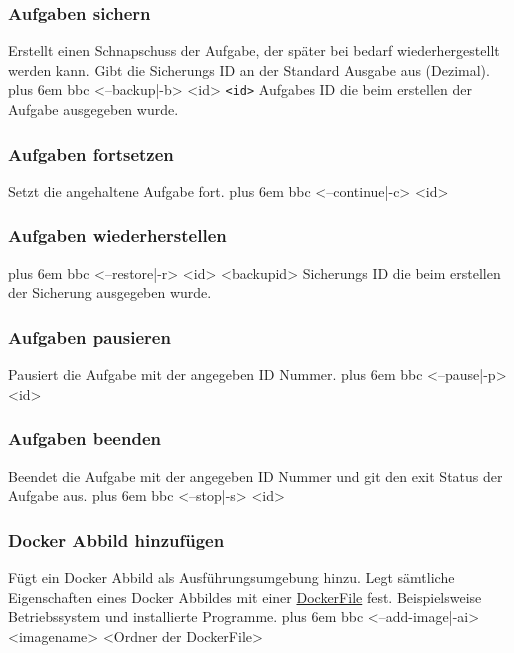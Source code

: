 \documentclass[a4paper,12pt]{article}
\makeatletter
\newenvironment{mycode}
 {\def\@xobeysp{\ }\verbatim\rightskip=0pt plus 6em\relax}
 {\endverbatim}
\makeatother
\begin{document}
\subsubsection{Aufgaben sichern}
Erstellt einen Schnapschuss der \gls{Aufgabe}, der später bei bedarf wiederhergestellt werden kann.
Gibt die Sicherungs ID an der Standard Ausgabe aus (Dezimal).
\begin{mycode}
bbc <--backup|-b> <id>
\end{mycode}
\texttt{<id>} \glspl{Aufgabe} ID die beim erstellen der \gls{Aufgabe} ausgegeben wurde.

\subsubsection{Aufgaben fortsetzen}
Setzt die angehaltene \gls{Aufgabe} fort.
\begin{mycode}
bbc <--continue|-c> <id>
\end{mycode}

\subsubsection{Aufgaben wiederherstellen}
\begin{mycode}
bbc <--restore|-r> <id> <backupid>
\end{mycode}
Sicherungs ID die beim erstellen der Sicherung ausgegeben wurde.

\subsubsection{Aufgaben pausieren}
Pausiert die \gls{Aufgabe} mit der angegeben ID Nummer.
\begin{mycode}
bbc <--pause|-p> <id>
\end{mycode}

\subsubsection{Aufgaben beenden}
Beendet die \gls{Aufgabe} mit der angegeben ID Nummer und git den exit Status der \gls{Aufgabe} aus.
\begin{mycode}
bbc <--stop|-s> <id>
\end{mycode}

\subsubsection{Docker Abbild hinzufügen}
Fügt ein \gls{Docker} Abbild als Ausführungsumgebung hinzu.
Legt sämtliche Eigenschaften eines \gls{Docker} Abbildes mit einer \href{https://docs.\gls{Docker}.com/engine/reference/builder/}{DockerFile} fest.
Beispielsweise Betriebssystem und installierte Programme. 
\begin{mycode}
bbc <--add-image|-ai> <imagename> <Ordner der \gls{Docker}File>
\end{mycode}
\end{document}
